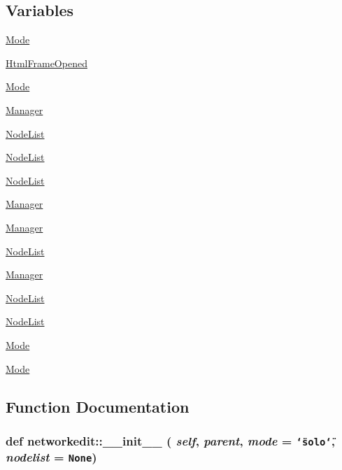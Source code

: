 \subsection*{Variables}
\begin{CompactItemize}
\item 
\hyperlink{namespacenetworkedit_6d69d76b8b1b34286bca7d797b7d9053}{Mode}
\item 
\hyperlink{namespacenetworkedit_ddee62320ad1538935c4fb221114ad6c}{Html\-Frame\-Opened}
\item 
\hyperlink{namespacenetworkedit_6d69d76b8b1b34286bca7d797b7d9053}{Mode}
\item 
\hyperlink{namespacenetworkedit_cf4848f1a2b858ef442d2bcb3a348af1}{Manager}
\item 
\hyperlink{namespacenetworkedit_6a4290ba38225a18362b4ef9a9463b80}{Node\-List}
\item 
\hyperlink{namespacenetworkedit_6a4290ba38225a18362b4ef9a9463b80}{Node\-List}
\item 
\hyperlink{namespacenetworkedit_6a4290ba38225a18362b4ef9a9463b80}{Node\-List}
\item 
\hyperlink{namespacenetworkedit_cf4848f1a2b858ef442d2bcb3a348af1}{Manager}
\item 
\hyperlink{namespacenetworkedit_cf4848f1a2b858ef442d2bcb3a348af1}{Manager}
\item 
\hyperlink{namespacenetworkedit_6a4290ba38225a18362b4ef9a9463b80}{Node\-List}
\item 
\hyperlink{namespacenetworkedit_cf4848f1a2b858ef442d2bcb3a348af1}{Manager}
\item 
\hyperlink{namespacenetworkedit_6a4290ba38225a18362b4ef9a9463b80}{Node\-List}
\item 
\hyperlink{namespacenetworkedit_6a4290ba38225a18362b4ef9a9463b80}{Node\-List}
\item 
\hyperlink{namespacenetworkedit_6d69d76b8b1b34286bca7d797b7d9053}{Mode}
\item 
\hyperlink{namespacenetworkedit_6d69d76b8b1b34286bca7d797b7d9053}{Mode}
\end{CompactItemize}


\subsection{Function Documentation}
\hypertarget{namespacenetworkedit_82e0d4ac55ecdf8bf2a154ef2747c7b5}{
\subsubsection[\_\-\_\-init\_\-\_\-]{\setlength{\rightskip}{0pt plus 5cm}def networkedit::\_\-\_\-init\_\-\_\- ( {\em self},  {\em parent},  {\em mode} = {\tt \char`\"{}solo\char`\"{}},  {\em nodelist} = {\tt None})}}
\label{namespacenetworkedit_82e0d4ac55ecdf8bf2a154ef2747c7b5}




